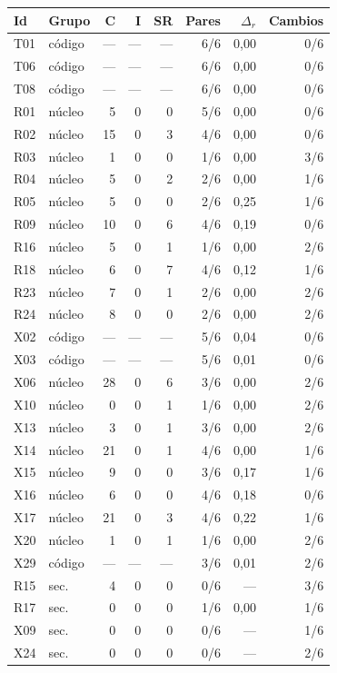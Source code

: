 \begin{tabular}{@{}llrrrrrr@{}}
\toprule
Id & Grupo & C & I & SR & Pares & $\Delta_r$ & Cambios \\
\midrule
T01 & código & --- & --- & --- & 6/6 & 0,00 & 0/6 \\
T06 & código & --- & --- & --- & 6/6 & 0,00 & 0/6 \\
T08 & código & --- & --- & --- & 6/6 & 0,00 & 0/6 \\
R01 & núcleo & 5 & 0 & 0 & 5/6 & 0,00 & 0/6 \\
R02 & núcleo & 15 & 0 & 3 & 4/6 & 0,00 & 0/6 \\
R03 & núcleo & 1 & 0 & 0 & 1/6 & 0,00 & 3/6 \\
R04 & núcleo & 5 & 0 & 2 & 2/6 & 0,00 & 1/6 \\
R05 & núcleo & 5 & 0 & 0 & 2/6 & 0,25 & 1/6 \\
R09 & núcleo & 10 & 0 & 6 & 4/6 & 0,19 & 0/6 \\
R16 & núcleo & 5 & 0 & 1 & 1/6 & 0,00 & 2/6 \\
R18 & núcleo & 6 & 0 & 7 & 4/6 & 0,12 & 1/6 \\
R23 & núcleo & 7 & 0 & 1 & 2/6 & 0,00 & 2/6 \\
R24 & núcleo & 8 & 0 & 0 & 2/6 & 0,00 & 2/6 \\
X02 & código & --- & --- & --- & 5/6 & 0,04 & 0/6 \\
X03 & código & --- & --- & --- & 5/6 & 0,01 & 0/6 \\
X06 & núcleo & 28 & 0 & 6 & 3/6 & 0,00 & 2/6 \\
X10 & núcleo & 0 & 0 & 1 & 1/6 & 0,00 & 2/6 \\
X13 & núcleo & 3 & 0 & 1 & 3/6 & 0,00 & 2/6 \\
X14 & núcleo & 21 & 0 & 1 & 4/6 & 0,00 & 1/6 \\
X15 & núcleo & 9 & 0 & 0 & 3/6 & 0,17 & 1/6 \\
X16 & núcleo & 6 & 0 & 0 & 4/6 & 0,18 & 0/6 \\
X17 & núcleo & 21 & 0 & 3 & 4/6 & 0,22 & 1/6 \\
X20 & núcleo & 1 & 0 & 1 & 1/6 & 0,00 & 2/6 \\
X29 & código & --- & --- & --- & 3/6 & 0,01 & 2/6 \\
R15 & sec. & 4 & 0 & 0 & 0/6 & --- & 3/6 \\
R17 & sec. & 0 & 0 & 0 & 1/6 & 0,00 & 1/6 \\
X09 & sec. & 0 & 0 & 0 & 0/6 & --- & 1/6 \\
X24 & sec. & 0 & 0 & 0 & 0/6 & --- & 2/6 \\
\bottomrule
\end{tabular}
